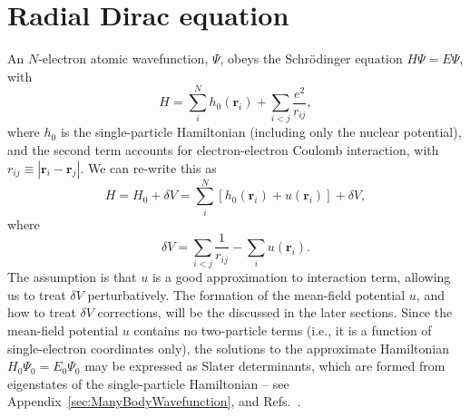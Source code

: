 \documentclass[10pt,twocolumn,a4paper]{article}%
\newcommand{\abs}[1]{\ensuremath{\left |#1\right |}}
\renewcommand{\v}[1]{\ensuremath{\boldsymbol{#1}}}		%
\newcommand{\be}{\begin{equation}}
\newcommand{\ee}{\end{equation}}
\begin{document}


{\footnotesize
\tableofcontents
}

\section{Radial Dirac equation}

An $N$-electron atomic wavefunction, $\Psi$, obeys the Schr\"odinger equation
$
H\Psi = E\Psi
$, with
\be
H = \sum_i^N h_0(\v{r}_i) + \sum_{i<j}\frac{e^2}{r_{ij}},
\ee
where $h_0$ is the single-particle Hamiltonian (including only the nuclear potential), and the second term accounts for electron-electron Coulomb interaction, with $r_{ij}\equiv\abs{\v{r}_i-\v{r}_j}$.
We can re-write this as
\be
H = H_0 + \delta V = \sum_i^N \left[h_0(\v{r}_i) + u(\v{r}_i)\right] + \delta V,
\ee
where
\[
\delta V = \sum_{i<j}\frac{1}{r_{ij}} - \sum_i  u(\v{r}_i).
\]
The assumption is that $u$ is a good approximation to interaction term, allowing us to treat $\delta V$ perturbatively.
The formation of the mean-field potential $u$, and how to treat $\delta V$ corrections, will be the discussed in the later sections.
Since the mean-field potential $u$ contains no two-particle terms (i.e., it is a function of single-electron coordinates only), the solutions to the approximate Hamiltonian
$
H_0 \Psi_0 = E_0\Psi_0
$
may be expressed as Slater determinants, which are formed from eigenstates of the single-particle Hamiltonian -- see Appendix~\ref{sec:ManyBodyWavefunction}, and Refs.~\cite{Lindgren1986,JohnsonBook2007}.
\end{document}
